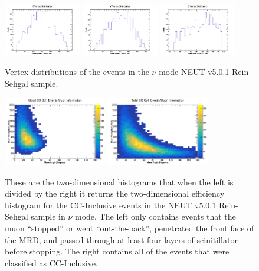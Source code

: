 \documentclass[11pt]{article}
\begin{document}
\begin{figure}[H]
\centering
\includegraphics[width=0.3\textwidth]{OldNMReinSehgalImages/4-XVertexDistributionNMORS.png}
\includegraphics[width=0.3\textwidth]{OldNMReinSehgalImages/3-YVertexDistributionNMORS.png}
\includegraphics[width=0.3\textwidth]{OldNMReinSehgalImages/2-ZVertexDistributionNMORS.png}
\caption{Vertex distributions of the events in the $\nu$-mode NEUT v5.0.1 Rein-Sehgal sample.}
\label{fig:app:NMVertexDistributionORS}
\end{figure}

\begin{figure}[H]
\centering
\includegraphics[width=0.4\textwidth]{OldNMReinSehgalImages/6-GoodCCCohMuonInfoNMORS.png}
\includegraphics[width=0.4\textwidth]{OldNMReinSehgalImages/9-TotalCCCohMuonInfoNMORS.png}
\caption{These are the two-dimensional histograms that when the left is divided by the right it returns the two-dimensional efficiency histogram for the CC-Inclusive events in the NEUT v5.0.1 Rein-Sehgal sample in $\nu$ mode. The left only contains events that the muon ``stopped'' or went ``out-the-back'', penetrated the front face of the MRD, and passed through at least four layers of scinitillator before stopping. The right contains all of the events that were classified as CC-Inclusive.}
\label{fig:app:NMCCInclusiveMuon2DORS}
\end{figure}
\end{document}
